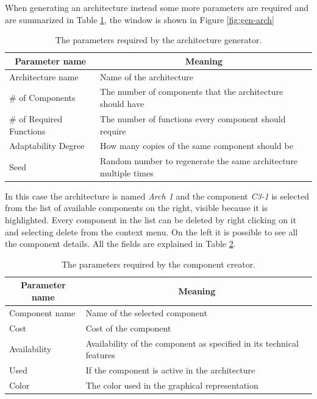 When generating an architecture instead some more parameters are required and are summarized in Table \ref{tab:gen-parameters}, the window is shown in Figure \ref{fig:gen-arch}

\begin{table}[ht!b]
	\centering
	\begin{tabular}{|l|l|}
		\hline
		\multicolumn{1}{|c|}{Parameter name} & \multicolumn{1}{c|}{Meaning} \\
		\hline 
		Architecture name & Name of the architecture \\
		\hline
		\# of Components & The number of components that the architecture should have \\
		\hline
		\# of Required Functions & The number of functions every component should require \\
		\hline
		Adaptability Degree & How many copies of the same component should be \\
		\hline
		Seed & Random number to regenerate the same architecture multiple times \\
		\hline
		
	\end{tabular} 
	\caption[Generator Parameters]{The parameters required by the architecture generator.}
	\label{tab:gen-parameters}
\end{table}

In this case the architecture is named \emph{Arch 1} and the component \emph{C3-1} is selected from the list of available components on the right, visible because it is highlighted. Every component in the list can be deleted by right clicking on it and selecting delete from the context menu. On the left it is possible to see all the component details. All the fields are explained in Table \ref{tab:comp-details}.

\begin{table}[ht!b]
	\centering
	\begin{tabular}{|l|l|}
		\hline
		\multicolumn{1}{|c|}{Parameter name} & \multicolumn{1}{c|}{Meaning} \\
		\hline 
		Component name & Name of the selected component \\
		\hline
		Cost & Cost of the component \\
		\hline
		Availability & Availability of the component as specified in its technical features\\
		\hline
		Used & If the component is active in the architecture \\
		\hline
		Color & The color used in the graphical representation \\
		\hline
		
	\end{tabular} 
	\caption[Component Parameters]{The parameters required by the component creator.}
	\label{tab:comp-details}
\end{table}

